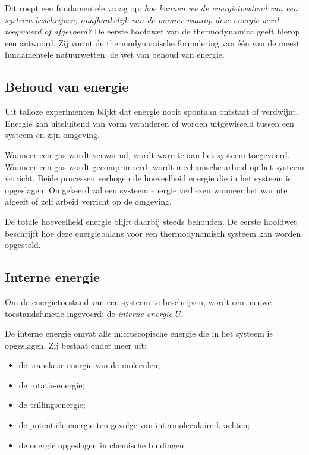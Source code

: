 Dit roept een fundamentele vraag op: \emph{hoe kunnen we de energietoestand van een systeem beschrijven, onafhankelijk van de manier waarop deze energie werd toegevoerd of afgevoerd?} De eerste hoofdwet van de thermodynamica geeft hierop een antwoord. Zij vormt de thermodynamische formulering van één van de meest fundamentele natuurwetten: de wet van behoud van energie.

\subsection{Behoud van energie}

Uit talloze experimenten blijkt dat energie nooit spontaan ontstaat of verdwijnt. Energie kan uitsluitend van vorm veranderen of worden uitgewisseld tussen een systeem en zijn omgeving.

Wanneer een gas wordt verwarmd, wordt warmte aan het systeem toegevoerd. Wanneer een gas wordt gecomprimeerd, wordt mechanische arbeid op het systeem verricht. Beide processen verhogen de hoeveelheid energie die in het systeem is opgeslagen. Omgekeerd zal een systeem energie verliezen wanneer het warmte afgeeft of zelf arbeid verricht op de omgeving.

De totale hoeveelheid energie blijft daarbij steeds behouden. De eerste hoofdwet beschrijft hoe deze energiebalans voor een thermodynamisch systeem kan worden opgesteld.

\subsection{Interne energie}

Om de energietoestand van een systeem te beschrijven, wordt een nieuwe toestandsfunctie ingevoerd: de \emph{interne energie} $U$.

De interne energie omvat alle microscopische energie die in het systeem is opgeslagen. Zij bestaat onder meer uit:

\begin{itemize}
    \item de translatie-energie van de moleculen;
    \item de rotatie-energie;
    \item de trillingsenergie;
    \item de potentiële energie ten gevolge van intermoleculaire krachten;
    \item de energie opgeslagen in chemische bindingen.
\end{itemize}


